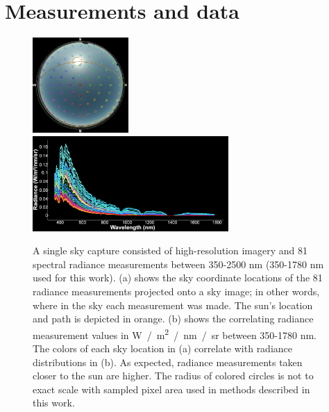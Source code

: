 \section{Measurements and data}
\label{sec:data}

\begin{figure}[pos=tbp]
\centering
\includegraphics[width=0.325\textwidth]{img/capturesky.png}~%
\includegraphics[width=0.665\textwidth]{img/capturerads.png}%
\caption[A sky capture consists of HDR imagery and 81 radiance measurements]{A single sky capture consisted of high-resolution imagery and 81 spectral radiance measurements between 350-2500 nm (350-1780 nm used for this work). (a) shows the sky coordinate locations of the 81 radiance measurements projected onto a sky image; in other words, where in the sky each measurement was made. The sun's location and path is depicted in orange. (b) shows the correlating radiance measurement values in W~/~m\textsuperscript{2}~/~nm~/~sr between 350-1780 nm. The colors of each sky location in (a) correlate with radiance distributions in (b). As expected, radiance measurements taken closer to the sun are higher. The radius of colored circles is not to exact scale with sampled pixel area used in methods described in this work.}
\label{fig:skycapture}
\end{figure}

